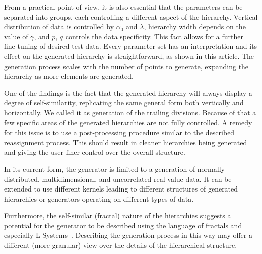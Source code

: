 \documentclass{article}
\begin{document}
	From a practical point of view, it is also essential that the parameters can be separated into groups, each controlling a different aspect of the hierarchy. Vertical distribution of data is controlled by $\alpha_0$ and $\lambda$, hierarchy width depends on the value of $\gamma$, and $p$, $q$ controls the data specificity. This fact allows for a further fine-tuning of desired test data. Every parameter set has an interpretation and its effect on the generated hierarchy is straightforward, as shown in this article. The generation process scales with the number of points to generate, expanding the hierarchy as more elements are generated.
    
    One of the findings is the fact that the generated hierarchy will always display a degree of self-similarity, replicating the same general form both vertically and horizontally. We called it as generation of the trailing divisions. Because of that a few specific areas of the generated hierarchies are not fully controlled. A remedy for this issue is to use a post-processing procedure similar to the described reassignment process. This should result in cleaner hierarchies being generated and giving the user finer control over the overall structure.
    
    In its current form, the generator is limited to a generation of normally-distributed, multidimensional, and uncorrelated real value data. It can be extended to use different kernels leading to different structures of generated hierarchies or generators operating on different types of data.
    
    Furthermore, the self-similar (fractal) nature of the hierarchies suggests a potential for the generator to be described using the language of fractals and especially L-Systems~\cite{prusinkiewicz2013lindenmayer}. Describing the generation process in this way may offer a different (more granular) view over the details of the hierarchical structure. 
	
\end{document}
